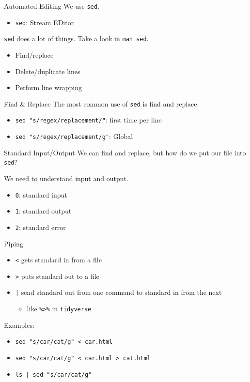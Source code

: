 \documentclass[pdf,usenames,dvipsnames,14pt]{beamer}%
\begin{document}
\begin{frame}{Automated Editing}
	We use \texttt{sed}.
	\begin{itemize}
		\item \texttt{sed}: Stream EDitor
	\end{itemize}
	\texttt{sed} does a lot of things.
	Take a look in \texttt{man sed}.
	\begin{itemize}
		\item Find/replace
		\item Delete/duplicate lines
		\item Perform line wrapping
	\end{itemize}
\end{frame}

\begin{frame}{Find \& Replace}
	The most common use of \texttt{sed} is find and replace.
	\begin{itemize}
		\item \texttt{sed "s/regex/replacement/"}: first time per line
		\item \texttt{sed "s/regex/replacement/g"}: Global
	\end{itemize}
\end{frame}

\begin{frame}{Standard Input/Output}
	We can find and replace, but how do we put our file into \texttt{sed}?
	
	We need to understand input and output.
	\begin{itemize}
		\item \texttt{0}: standard input
		\item \texttt{1}: standard output
		\item \texttt{2}: standard error
	\end{itemize}
\end{frame}

\begin{frame}{Piping}
	\begin{itemize}
		\item \texttt{<} gets standard in from a file
		\item \texttt{>} puts standard out to a file
		\item \texttt{|} send standard out from one command to standard in from the next
		\begin{itemize}
			\item like \texttt{\%>\%} in \texttt{tidyverse}
		\end{itemize}
	\end{itemize}
	Examples:
	\begin{itemize}
		\item \texttt{sed "s/car/cat/g" < car.html}
		\item \texttt{sed "s/car/cat/g" < car.html > cat.html}
		\item \texttt{ls | sed "s/car/cat/g"}
	\end{itemize}
\end{frame}
\end{document}
